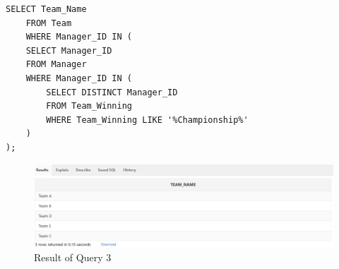 \begin{lstlisting}[caption={ Query 3},label={lst:q-3}]
    SELECT Team_Name
    FROM Team
    WHERE Manager_ID IN (
    SELECT Manager_ID
    FROM Manager
    WHERE Manager_ID IN (
        SELECT DISTINCT Manager_ID
        FROM Team_Winning
        WHERE Team_Winning LIKE '%Championship%'
    )
);
\end{lstlisting}
\begin{figure}[H]
    \centering
    \includegraphics[width=1\textwidth]{images/dml/Subq/q3.png}
    \caption{Result of Query 3}
\end{figure}
\clearpage